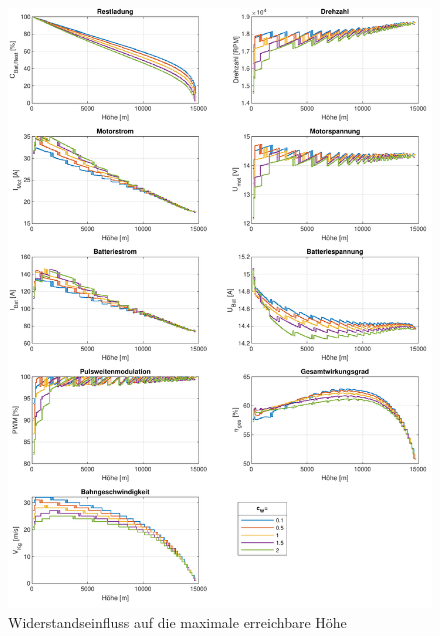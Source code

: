 \begin{figure}[H]
\centering
	\includegraphics[scale=0.7]{Diagramme/Untersuchung_c_W.pdf}
	\caption{Widerstandseinfluss auf die maximale erreichbare Höhe}
	\label{abb:c_W_einfluss}
\end{figure}


